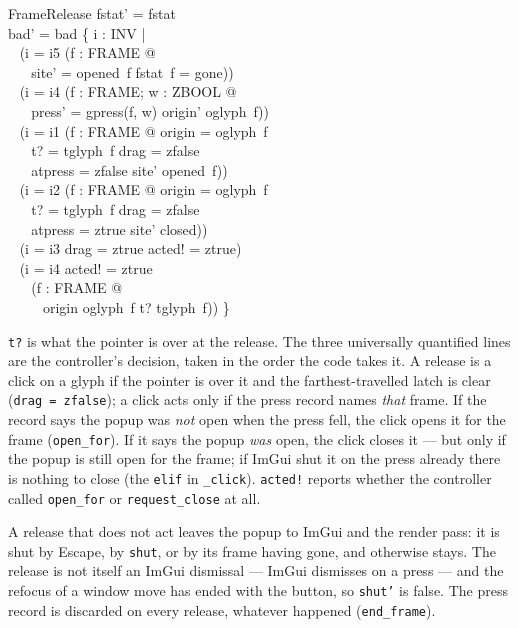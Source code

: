 \documentclass[a4paper,10pt,fleqn]{article}
\begin{document}
\begin{schema}{FrameRelease}
  fstat' = fstat \\
  bad' = bad \cup \{ i : INV | \\
  \quad~ (i = i5 \land (\exists f : FRAME @ \\
  \quad~ \quad~ site' = opened~f \land fstat~f = gone)) \\
  \quad~ \lor (i = i4 \land (\exists f : FRAME; w : ZBOOL @ \\
  \quad~ \quad~ press' = gpress(f, w) \land origin' \neq oglyph~f)) \\
  \quad~ \lor (i = i1 \land (\exists f : FRAME @ origin = oglyph~f \\
  \quad~ \quad~ \land t? = tglyph~f \land drag = zfalse \\
  \quad~ \quad~ \land atpress = zfalse \land site' \neq opened~f)) \\
  \quad~ \lor (i = i2 \land (\exists f : FRAME @ origin = oglyph~f \\
  \quad~ \quad~ \land t? = tglyph~f \land drag = zfalse \\
  \quad~ \quad~ \land atpress = ztrue \land site' \neq closed)) \\
  \quad~ \lor (i = i3 \land drag = ztrue \land acted! = ztrue) \\
  \quad~ \lor (i = i4 \land acted! = ztrue \\
  \quad~ \quad~ \land (\forall f : FRAME @ \\
  \quad~ \quad~ \quad~ origin \neq oglyph~f \lor t? \neq tglyph~f)) \}
\end{schema}

\texttt{t?} is what the pointer is over at the release.  The three universally
quantified lines are the controller's decision, taken in the order the code
takes it.  A release is a click on a glyph if the pointer is over it and the
farthest-travelled latch is clear (\texttt{drag~=~zfalse}); a click acts only
if the press record names \emph{that} frame.  If the record says the popup was
\emph{not} open when the press fell, the click opens it for the frame
(\texttt{open\_for}).  If it says the popup \emph{was} open, the click closes
it --- but only if the popup is still open for the frame; if ImGui shut it on
the press already there is nothing to close (the \texttt{elif} in
\texttt{\_click}).  \texttt{acted!} reports whether the controller called
\texttt{open\_for} or \texttt{request\_close} at all.

A release that does not act leaves the popup to ImGui and the render pass: it
is shut by Escape, by \texttt{shut}, or by its frame having gone, and otherwise
stays.  The release is not itself an ImGui dismissal --- ImGui dismisses on a
press --- and the refocus of a window move has ended with the button, so
\texttt{shut'} is false.  The press record is discarded on every release,
whatever happened (\texttt{end\_frame}).
\end{document}
